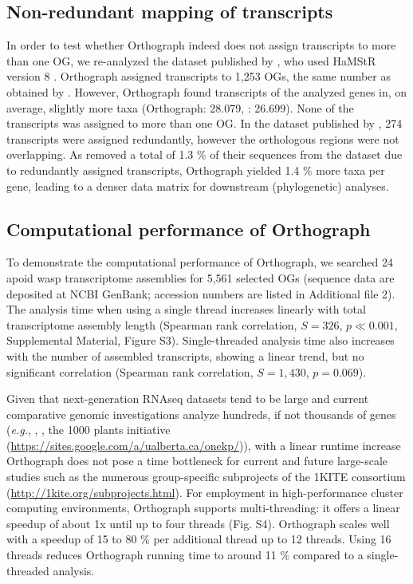 \subsection{Non-redundant mapping of
transcripts}\label{non-redundant-mapping-of-transcripts}

In order to test whether Orthograph indeed does not assign transcripts
to more than one OG, we re-analyzed the dataset published by
\cite{Struck2014}, who used HaMStR version 8 \cite{Ebersberger2009}.
Orthograph assigned transcripts to 1,253 OGs, the same number as
obtained by \cite{Struck2014}. However, Orthograph found transcripts of
the analyzed genes in, on average, slightly more taxa (Orthograph:
28.079, \cite{Struck2014}: 26.699). None of the transcripts was assigned
to more than one OG. In the dataset published by \cite{Struck2014}, 274
transcripts were assigned redundantly, however the orthologous regions
were not overlapping. As \cite{Struck2014} removed a total of 1.3 \% of
their sequences from the dataset due to redundantly assigned
transcripts, Orthograph yielded 1.4 \% more taxa per gene, leading to a
denser data matrix for downstream (phylogenetic) analyses.

\subsection{Computational performance of
Orthograph}\label{computational-performance-of-orthograph}

To demonstrate the computational performance of Orthograph, we searched
24 apoid wasp transcriptome assemblies for 5,561 selected OGs (sequence
data are deposited at NCBI GenBank; accession numbers are listed in
Additional file 2). The analysis time when using a single thread
increases linearly with total transcriptome assembly length (Spearman
rank correlation, $S = 326$, $p \ll 0.001$, Supplemental Material,
Figure S3). Single-threaded analysis time also increases with the number
of assembled transcripts, showing a linear trend, but no significant
correlation (Spearman rank correlation, $S = 1,430$, $p = 0.069$).

Given that next-generation RNAseq datasets tend to be large and current
comparative genomic investigations analyze hundreds, if not thousands of
genes (\emph{e.g.}, \cite{Misof2014}, \cite{Jarvis2014}, the 1000
plants initiative
(\url{https://sites.google.com/a/ualberta.ca/onekp/})), with a linear
runtime increase Orthograph does not pose a time bottleneck for current
and future large-scale studies such as the numerous group-specific
subprojects of the 1KITE consortium
(\url{http://1kite.org/subprojects.html}). For employment in
high-performance cluster computing environments, Orthograph supports
multi-threading: it offers a linear speedup of about 1x until up to four
threads (Fig. S4). Orthograph scales well with a speedup of 15 to 80 \%
per additional thread up to 12 threads. Using 16 threads reduces
Orthograph running time to around 11 \% compared to a single-threaded
analysis.

